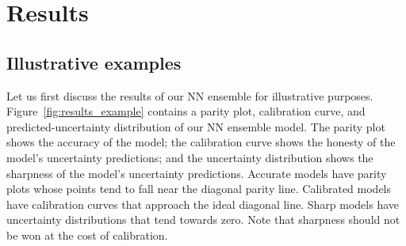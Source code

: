 \documentclass[]{achemso}
\begin{document}

\section{Results}

\subsection{Illustrative examples}

Let us first discuss the results of our \gls{NN} ensemble for illustrative purposes.
Figure~\ref{fig:results_example} contains a parity plot, calibration curve, and predicted-uncertainty distribution of our \gls{NN} ensemble model.
The parity plot shows the accuracy of the model; the calibration curve shows the honesty of the model's uncertainty predictions; and the uncertainty distribution shows the sharpness of the model's uncertainty predictions.
Accurate models have parity plots whose points tend to fall near the diagonal parity line.
Calibrated models have calibration curves that approach the ideal diagonal line.
Sharp models have uncertainty distributions that tend towards zero.
Note that sharpness should not be won at the cost of calibration.
\end{document}
